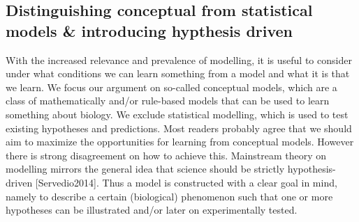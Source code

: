 \subsection{Distinguishing conceptual from statistical models & introducing hypthesis driven}

With the increased relevance and prevalence of modelling, it is useful to consider under what conditions we can learn something from a model and what it is that we learn. We focus our argument on so-called  conceptual models, which are a class of mathematically and/or rule-based models that can be used to learn something about biology. We exclude statistical modelling, which is used to test existing hypotheses and predictions. Most readers probably agree that we should aim to maximize the opportunities for learning from conceptual models. However there is strong disagreement on how to achieve this. Mainstream theory on modelling mirrors the general idea that science should be strictly hypothesis-driven [Servedio2014]. Thus a model is constructed with a clear goal in mind, namely to describe a certain (biological) phenomenon such that one or more hypotheses can be illustrated and/or later on experimentally tested.
